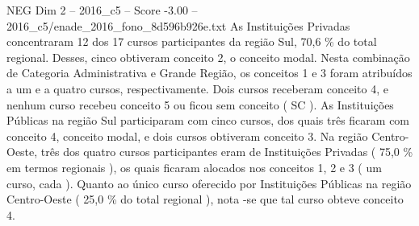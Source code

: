 \begin{textsample}{NEG Dim 2 – 2016\_c5 – Score -3.00 – 2016\_c5/enade\_2016\_fono\_8d596b926e.txt}
As Instituições Privadas concentraram 12 dos 17 cursos participantes da região Sul, 70,6 \% do total regional.
Desses, cinco obtiveram conceito 2, o conceito modal.
Nesta combinação de Categoria Administrativa e Grande Região, os conceitos 1 e 3 foram atribuídos a um e a quatro cursos, respectivamente.
Dois cursos receberam conceito 4, e nenhum curso recebeu conceito 5 ou ficou sem conceito ( SC ).
As Instituições Públicas na região Sul participaram com cinco cursos, dos quais três ficaram com conceito 4, conceito modal, e dois cursos obtiveram conceito 3.
Na região Centro-Oeste, três dos quatro cursos participantes eram de Instituições Privadas ( 75,0 \% em termos regionais ), os quais ficaram alocados nos conceitos 1, 2 e 3 ( um curso, cada ).
Quanto ao único curso oferecido por Instituições Públicas na região Centro-Oeste ( 25,0 \% do total regional ), nota -se que tal curso obteve conceito 4.

\end{textsample}
